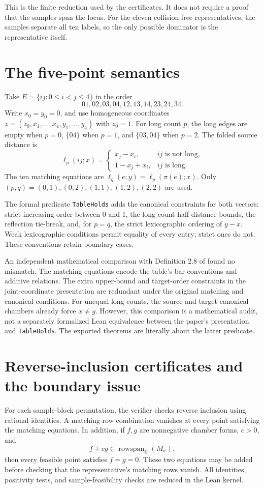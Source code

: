 \documentclass[11pt]{article}
\newcommand{\Q}{\mathbb Q}
\begin{document}
This is the finite reduction used by the certificates. It does not require a proof that the samples span the locus. For the eleven collision-free representatives, the samples separate all ten labels, so the only possible dominator is the representative itself.

\section{The five-point semantics}
Take $E=\{ij:0\leq i<j\leq4\}$ in the order
\[
 01,02,03,04,12,13,14,23,24,34.
\]
Write $x_0=y_0=0$, and use homogeneous coordinates
$z=(z_0,x_1,\ldots,x_4,y_1,\ldots,y_4)$ with $z_0=1$.
For long count $p$, the long edges are empty when $p=0$, $\{04\}$ when $p=1$, and $\{03,04\}$ when $p=2$. The folded source distance is
\[
 \ell_p(ij;x)=
 \begin{cases}
 x_j-x_i,&ij\text{ is not long},\\
 1-x_j+x_i,&ij\text{ is long}.
 \end{cases}
\]
The ten matching equations are $\ell_q(e;y)=\ell_p(\pi(e);x)$.
Only $(p,q)=(0,1),(0,2),(1,1),(1,2),(2,2)$ are used.

The formal predicate \texttt{TableHolds} adds the canonical constraints for both vectors: strict increasing order between 0 and 1, the long-count half-distance bounds, the reflection tie-break, and, for $p=q$, the strict lexicographic ordering of $y-x$. Weak lexicographic conditions permit equality of every entry; strict ones do not. These conventions retain boundary cases.

An independent mathematical comparison with Definition 2.8 of \cite{EJ} found no mismatch. The matching equations encode the table's bar conventions and additive relations. The extra upper-bound and target-order constraints in the joint-coordinate presentation are redundant under the original matching and canonical conditions. For unequal long counts, the source and target canonical chambers already force $x\ne y$. However, this comparison is a mathematical audit, not a separately formalized Lean equivalence between the paper's presentation and \texttt{TableHolds}. The exported theorems are literally about the latter predicate.

\section{Reverse-inclusion certificates and the boundary issue}
For each sample-block permutation, the verifier checks reverse inclusion using rational identities. A matching-row combination vanishes at every point satisfying the matching equations. In addition, if $f,g$ are nonnegative chamber forms, $c>0$, and
\[
 f+c g\in\operatorname{rowspan}_{\Q}(M_\sigma),
\]
then every feasible point satisfies $f=g=0$. These two equations may be added before checking that the representative's matching rows vanish. All identities, positivity tests, and sample-feasibility checks are reduced in the Lean kernel.
\end{document}
